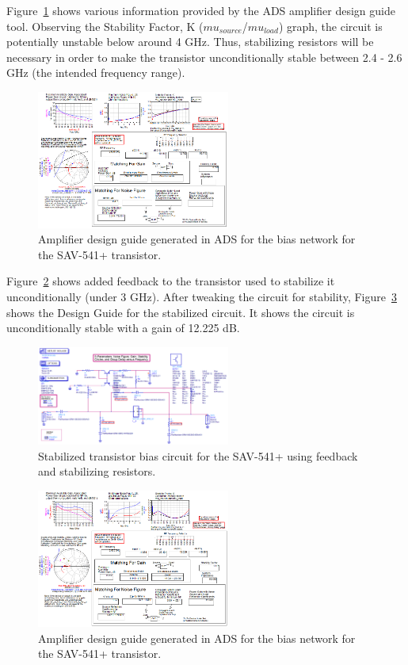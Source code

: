 \documentclass[conference]{IEEEtran}
\begin{document}
Figure~\ref{fig:designguide} shows various information provided by the ADS amplifier design guide tool. Observing the Stability Factor, K ($mu_{source}$/$mu_{load}$) graph, the circuit is potentially unstable below around 4 GHz. Thus, stabilizing resistors will be necessary in order to make the transistor unconditionally stable between 2.4 - 2.6 GHz (the intended frequency range).

\begin{figure}[!h]
\centering
\includegraphics[width=2.5in]{pics/DesignGuideUnoptimized.png}
\caption{Amplifier design guide generated in ADS for the bias network for the SAV-541+ transistor.}
\label{fig:designguide}
\end{figure}

Figure~\ref{fig:designcuidecircuitstabilized} shows added feedback to the transistor used to stabilize it unconditionally (under 3 GHz). After tweaking the circuit for stability, Figure~\ref{fig:designcuidesimulationstabilized} shows the Design Guide for the stabilized circuit. It shows the circuit is unconditionally stable with a gain of 12.225 dB.

\begin{figure}[!h]
\centering
\includegraphics[width=2.5in]{pics/DesignGuideStablizedCircuit.png}
\caption{Stabilized transistor bias circuit for the SAV-541+ using feedback and stabilizing resistors.}
\label{fig:designcuidecircuitstabilized}
\end{figure}

\begin{figure}[!h]
\centering
\includegraphics[width=2.5in]{pics/DesignGuideStablizedSimulation.png}
\caption{Amplifier design guide generated in ADS for the bias network for the SAV-541+ transistor.}
\label{fig:designcuidesimulationstabilized}
\end{figure}
\end{document}
